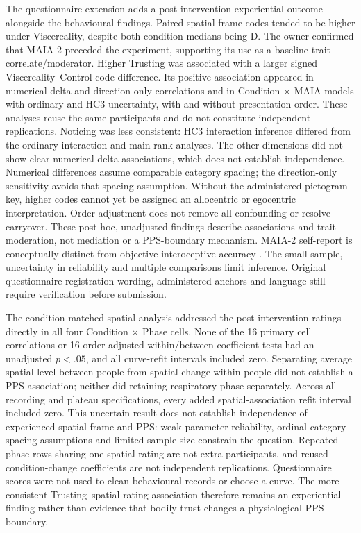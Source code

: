 The questionnaire extension adds a post-intervention experiential outcome alongside the behavioural findings. Paired spatial-frame codes tended to be higher under Viscereality, despite both condition medians being D. The owner confirmed that MAIA-2 preceded the experiment, supporting its use as a baseline trait correlate/moderator. Higher Trusting was associated with a larger signed Viscereality--Control code difference. Its positive association appeared in numerical-delta and direction-only correlations and in Condition $\times$ MAIA models with ordinary and HC3 uncertainty, with and without presentation order. These analyses reuse the same participants and do not constitute independent replications. Noticing was less consistent: HC3 interaction inference differed from the ordinary interaction and main rank analyses. The other dimensions did not show clear numerical-delta associations, which does not establish independence. Numerical differences assume comparable category spacing; the direction-only sensitivity avoids that spacing assumption. Without the administered pictogram key, higher codes cannot yet be assigned an allocentric or egocentric interpretation. Order adjustment does not remove all confounding or resolve carryover. These post hoc, unadjusted findings describe associations and trait moderation, not mediation or a PPS-boundary mechanism. MAIA-2 self-report is conceptually distinct from objective interoceptive accuracy \citep{Mehling2018,Garfinkel2015}. The small sample, uncertainty in reliability and multiple comparisons limit inference. Original questionnaire registration wording, administered anchors and language still require verification before submission.

The condition-matched spatial analysis addressed the post-intervention ratings directly in all four Condition $\times$ Phase cells. None of the 16 primary cell correlations or 16 order-adjusted within/between coefficient tests had an unadjusted $p<.05$, and all curve-refit intervals included zero. Separating average spatial level between people from spatial change within people did not establish a PPS association; neither did retaining respiratory phase separately. Across all recording and plateau specifications, every added spatial-association refit interval included zero. This uncertain result does not establish independence of experienced spatial frame and PPS: weak parameter reliability, ordinal category-spacing assumptions and limited sample size constrain the question. Repeated phase rows sharing one spatial rating are not extra participants, and reused condition-change coefficients are not independent replications. Questionnaire scores were not used to clean behavioural records or choose a curve. The more consistent Trusting--spatial-rating association therefore remains an experiential finding rather than evidence that bodily trust changes a physiological PPS boundary.

